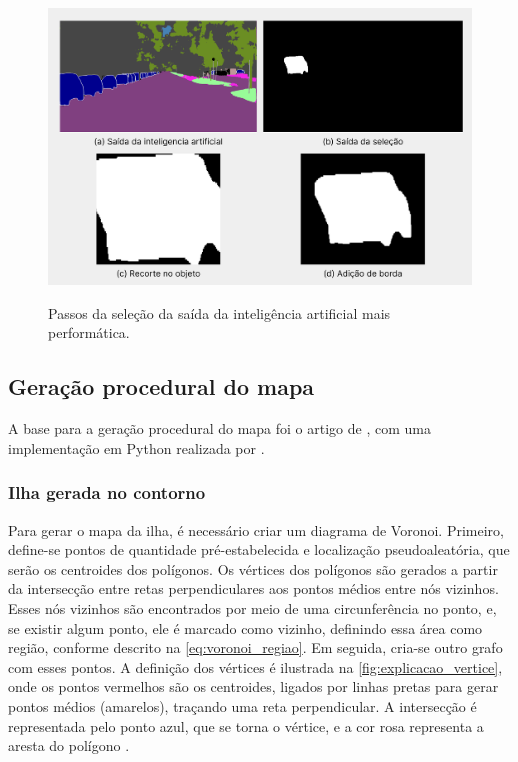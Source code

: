 \begin{figure}[!ht]
\centering
\caption{Passos da seleção da saída da inteligência artificial mais performática.}
\includegraphics[width=1.0\textwidth]{figures/saidas_selecao_2.png}
\label{fig:saidas_selecao_perf}
\end{figure}

\subsection{Geração procedural do mapa}

A base para a geração procedural do mapa foi o artigo de , com uma implementação em Python realizada por .

\subsubsection{Ilha gerada no contorno}

Para gerar o mapa da ilha, é necessário criar um diagrama de Voronoi. Primeiro, define-se pontos de quantidade pré-estabelecida e localização pseudoaleatória, que serão os centroides dos polígonos. Os vértices dos polígonos são gerados a partir da intersecção entre retas perpendiculares aos pontos médios entre nós vizinhos. Esses nós vizinhos são encontrados por meio de uma circunferência no ponto, e, se existir algum ponto, ele é marcado como vizinho, definindo essa área como região, conforme descrito na \cref{eq:voronoi_regiao}. Em seguida, cria-se outro grafo com esses pontos. A definição dos vértices é ilustrada na \cref{fig:explicacao_vertice}, onde os pontos vermelhos são os centroides, ligados por linhas pretas para gerar pontos médios (amarelos), traçando uma reta perpendicular. A intersecção é representada pelo ponto azul, que se torna o vértice, e a cor rosa representa a aresta do polígono \cite{amitp2010,rodrigues_diagrama_2019}.

